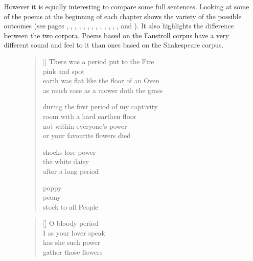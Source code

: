 \spirals

However it is equally interesting to compare some full sentences. Looking at some of the poems at the beginning of each chapter shows the variety of the possible outcomes (see pages \pageref{ch:introduction}, \pageref{ch:inspirations}, \pageref{ch:methodology}, \pageref{ch:pataphysics}, \pageref{ch:creativity}, \pageref{ch:technology}, \pageref{ch:evaluation}, \pageref{ch:foundations}, \pageref{ch:interpretation}, \pageref{ch:implementation}, \pageref{ch:applications}, \pageref{ch:analysis}, \pageref{ch:aspirations}, and \pageref{ch:observations}). It also highlights the difference between the two corpora. Poems based on the Faustroll corpus have a very different sound and feel to it than ones based on the Shakespeare corpus.

\begin{figure}[!htbp]
\centering
\begin{minipage}{.45\linewidth}
  \settowidth{\versewidth}{earth was flat like the floor of an Oven}
  \begin{verse}[\versewidth]\sffamily\footnotesize
    There was a period put to the Fire\\
    pink and spot\\
    earth was flat like the floor of an Oven\\
    as much ease as a mower doth the grass

    during the first period of my captivity\\
    room with a hard earthen floor\\
    not within everyone's power\\
    or your favourite flowers died

    shocks lose power\\
    the white daisy\\
    after a long period

    poppy\\
    peony\\
    stock to all People
  \end{verse}
\end{minipage}
\hspace{.02\linewidth}
\begin{minipage}{.45\linewidth}
  \settowidth{\versewidth}{led by their master to the flow'red fields}
  \begin{verse}[\versewidth]\sffamily\footnotesize
    O bloody period\\
    I as your lover speak\\
    has she such power\\
    gather those flowers


\end{verse}
\end{minipage}
\end{figure}
